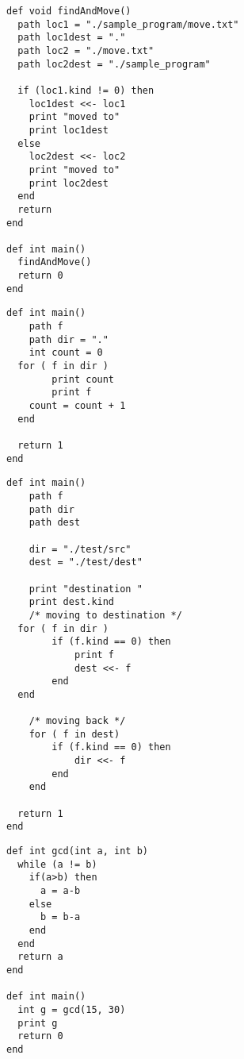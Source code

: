 \documentclass[11pt]{article}
\begin{document}
\begin{listing}[H]
  \begin{verbatim}
def void findAndMove()
  path loc1 = "./sample_program/move.txt"
  path loc1dest = "."
  path loc2 = "./move.txt"
  path loc2dest = "./sample_program"

  if (loc1.kind != 0) then
    loc1dest <<- loc1
    print "moved to"
    print loc1dest
  else
    loc2dest <<- loc2
    print "moved to"
    print loc2dest
  end
  return
end

def int main()
  findAndMove()
  return 0
end
  \end{verbatim}
\end{listing}


\begin{listing}[H]
  \begin{verbatim}
def int main()
    path f
    path dir = "."
    int count = 0
  for ( f in dir )
        print count
        print f
    count = count + 1
  end

  return 1
end
  \end{verbatim}
\end{listing}

\begin{listing}[H]
  \begin{verbatim}
def int main()
    path f
    path dir
    path dest

    dir = "./test/src"
    dest = "./test/dest"

    print "destination "
    print dest.kind
    /* moving to destination */
  for ( f in dir )
        if (f.kind == 0) then
            print f
            dest <<- f
        end
  end

    /* moving back */
    for ( f in dest)
        if (f.kind == 0) then
            dir <<- f
        end
    end

  return 1
end

  \end{verbatim}
\end{listing}

\begin{listing}[H]
  \begin{verbatim}
def int gcd(int a, int b)
  while (a != b)
    if(a>b) then
      a = a-b
    else
      b = b-a
    end
  end
  return a
end

def int main()
  int g = gcd(15, 30)
  print g
  return 0
end
  \end{verbatim}
\end{listing}
\end{document}
